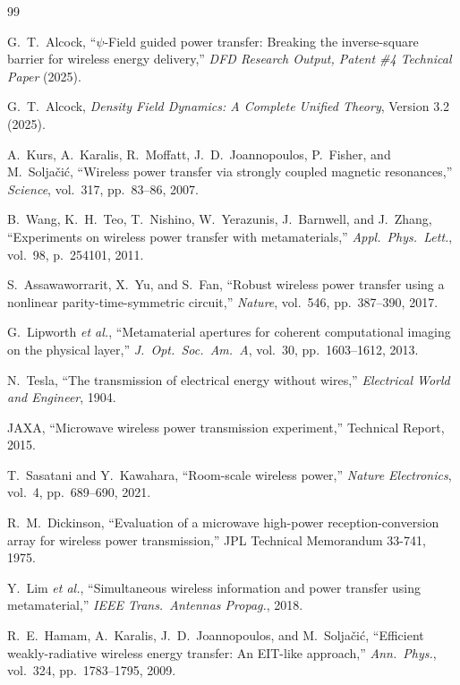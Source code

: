 \documentclass[journal,twocolumn]{IEEEtran}
\begin{document}
\begin{thebibliography}{99}

G.~T.~Alcock, ``$\psi$-Field guided power transfer: Breaking the
inverse-square barrier for wireless energy delivery,''
\emph{DFD Research Output, Patent \#4 Technical Paper} (2025).

G.~T.~Alcock, \emph{Density Field Dynamics: A Complete Unified Theory},
Version 3.2 (2025).

A.~Kurs, A.~Karalis, R.~Moffatt, J.~D.~Joannopoulos, P.~Fisher, and
M.~Solja\v{c}i\'{c}, ``Wireless power transfer via strongly coupled
magnetic resonances,'' \emph{Science}, vol.~317, pp.~83--86, 2007.

B.~Wang, K.~H.~Teo, T.~Nishino, W.~Yerazunis, J.~Barnwell, and
J.~Zhang, ``Experiments on wireless power transfer with metamaterials,''
\emph{Appl.\ Phys.\ Lett.}, vol.~98, p.~254101, 2011.

S.~Assawaworrarit, X.~Yu, and S.~Fan, ``Robust wireless power transfer
using a nonlinear parity-time-symmetric circuit,''
\emph{Nature}, vol.~546, pp.~387--390, 2017.

G.~Lipworth \emph{et al.}, ``Metamaterial apertures for coherent
computational imaging on the physical layer,''
\emph{J.\ Opt.\ Soc.\ Am.\ A}, vol.~30, pp.~1603--1612, 2013.

N.~Tesla, ``The transmission of electrical energy without wires,''
\emph{Electrical World and Engineer}, 1904.

JAXA, ``Microwave wireless power transmission experiment,''
Technical Report, 2015.

T.~Sasatani and Y.~Kawahara, ``Room-scale wireless power,''
\emph{Nature Electronics}, vol.~4, pp.~689--690, 2021.

R.~M.~Dickinson, ``Evaluation of a microwave high-power
reception-conversion array for wireless power transmission,''
JPL Technical Memorandum 33-741, 1975.

Y.~Lim \emph{et al.}, ``Simultaneous wireless information and power
transfer using metamaterial,'' \emph{IEEE Trans.\ Antennas Propag.},
2018.

R.~E.~Hamam, A.~Karalis, J.~D.~Joannopoulos, and M.~Solja\v{c}i\'{c},
``Efficient weakly-radiative wireless energy transfer: An EIT-like
approach,'' \emph{Ann.\ Phys.}, vol.~324, pp.~1783--1795, 2009.


\end{thebibliography}
\end{document}
